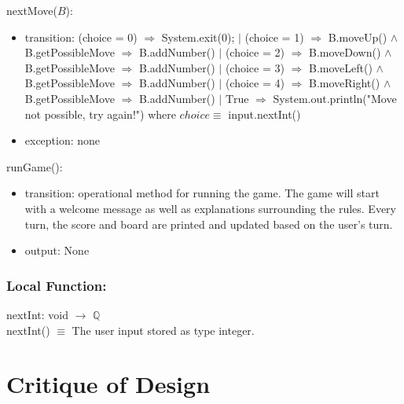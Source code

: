 \documentclass[12pt]{article}
\begin{document}
\noindent nextMove($B$):
\begin{itemize}
\item transition: (choice = 0) $\Rightarrow$ System.exit(0); $|$ \newline (choice = 1) $\Rightarrow$ B.moveUp() $\land$ B.getPossibleMove $\Rightarrow$ B.addNumber() $|$ \newline (choice = 2) $\Rightarrow$ B.moveDown() $\land$ B.getPossibleMove $\Rightarrow$ B.addNumber() $|$ \newline (choice = 3) $\Rightarrow$ B.moveLeft() $\land$ B.getPossibleMove $\Rightarrow$ B.addNumber() $|$ \newline (choice = 4) $\Rightarrow$ B.moveRight() $\land$ B.getPossibleMove $\Rightarrow$ B.addNumber() $|$ \newline $\text{True}$ $\Rightarrow$ System.out.println("Move not possible, try again!")
\newline where $\mathit{choice} \equiv$ input.nextInt()
  
\item exception: none
\end{itemize}

\noindent runGame():
\begin{itemize}
  \item transition: operational method for running the game. The game will start with a welcome message as well as explanations surrounding the rules. Every turn, the score and board are printed and updated based on the user's turn.
  \item output: None
\end{itemize}

\subsubsection*{Local Function:}

nextInt: void $\rightarrow$ $\mathbb{Q}$ \\
nextInt() $\equiv$ The user input stored as type integer.

\newpage

\section*{Critique of Design}
\end{document}
